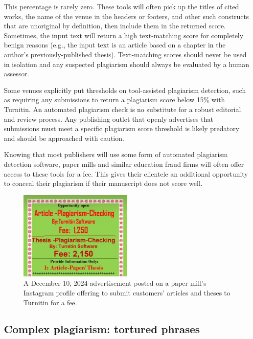 \documentclass[letterpaper, 12pt]{article}
\begin{document}
This percentage is rarely zero. These tools will often pick up the titles of cited works, the name of the venue in the headers or footers, and other such constructs that are unoriginal by definition, then include them in the returned score. Sometimes, the input text will return a high text-matching score for completely benign reasons (e.g., the input text is an article based on a chapter in the author's previously-published thesis). Text-matching scores should never be used in isolation and any suspected plagiarism should always be evaluated by a human assessor.

Some venues explicitly put thresholds on tool-assisted plagiarism detection, such as requiring any submissions to return a plagiarism score below 15\% with Turnitin. An automated plagiarism check is no substitute for a robust editorial and review process. Any publishing outlet that openly advertises that submissions must meet a specific plagiarism score threshold is likely predatory and should be approached with caution.

Knowing that most publishers will use some form of automated plagiarism detection software, paper mills and similar education fraud firms will often offer access to these tools for a fee. This gives their clientele an additional opportunity to conceal their plagiarism if their manuscript does not score well.

\begin{figure}[h!tbp]
    \centering
    \includegraphics[width=0.5\textwidth]{img/plagiarism/Screenshot_20250328_132930_Instagram.jpg}
    \caption*{A December 10, 2024 advertisement posted on a paper mill's Instagram profile offering to submit customers' articles and theses to Turnitin for a fee.}
\end{figure}

\subsection*{Complex plagiarism: tortured phrases}
\end{document}
